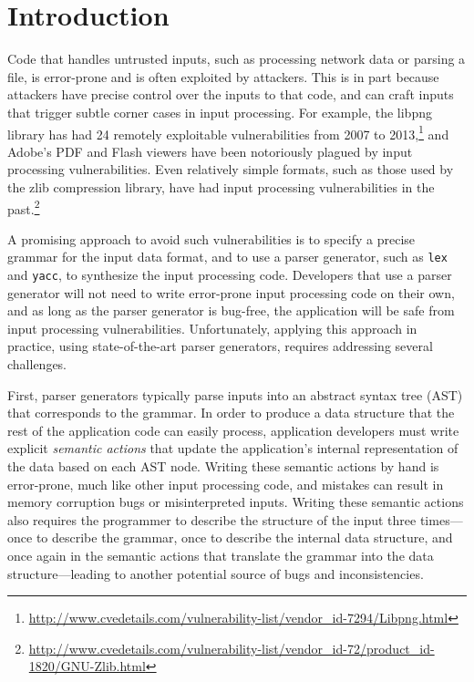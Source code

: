 \section{Introduction}

Code that handles untrusted inputs, such as processing network
data or parsing a file, is error-prone and is often exploited by
attackers.  This is in part because attackers have precise control
over the inputs to that code, and can craft inputs that trigger
subtle corner cases in input processing.  For example, the libpng
library has had 24 remotely exploitable vulnerabilities from 2007 to
2013,\footnote{\url{http://www.cvedetails.com/vulnerability-list/vendor_id-7294/Libpng.html}}
and Adobe's PDF and Flash viewers have been notoriously
plagued by input processing vulnerabilities.  Even relatively
simple formats, such as those used by the zlib compression
library, have had input processing vulnerabilities in the
past.\footnote{\url{http://www.cvedetails.com/vulnerability-list/vendor_id-72/product_id-1820/GNU-Zlib.html}}

A promising approach to avoid such vulnerabilities is to specify a
precise grammar for the input data format, and to use a parser generator,
such as {\tt lex} and {\tt yacc}, to synthesize the input processing
code.  Developers that use a parser generator will not need to write
error-prone input processing code on their own, and as long as the
parser generator is bug-free, the application will be safe from input
processing vulnerabilities.  Unfortunately, applying this approach in
practice, using state-of-the-art parser generators, requires addressing
several challenges.

First, parser generators typically parse inputs into an abstract syntax
tree (AST) that corresponds to the grammar.  In order to produce a data
structure that the rest of the application code can easily process,
application developers must write explicit {\em semantic actions} that
update the application's internal representation of the data based on
each AST node.  Writing these semantic actions by hand is error-prone,
much like other input processing code, and mistakes can result in memory
corruption bugs or misinterpreted inputs.  Writing these semantic actions
also requires the programmer to describe the structure of the input three
times---once to describe the grammar, once to describe the internal data
structure, and once again in the semantic actions that translate the
grammar into the data structure---leading to another potential source
of bugs and inconsistencies.

